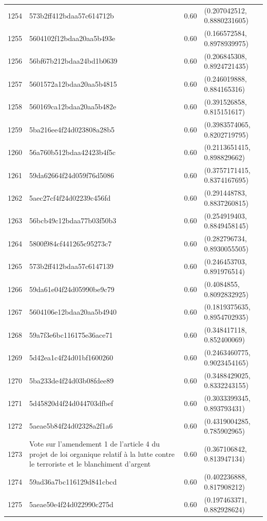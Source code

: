 \begin{table}[ht]
\begin{tabular}{rlrl}
  1254 & 573b2ff412bdaa57c614712b & 0.60 & (0.207042512, 0.8880231605) \\ 
  1255 & 5604102f12bdaa20aa5b493e & 0.60 & (0.166572584, 0.8978939975) \\ 
  1256 & 56bf67b212bdaa24bd1b0639 & 0.60 & (0.206845308, 0.8924721435) \\ 
  1257 & 5601572a12bdaa20aa5b4815 & 0.60 & (0.246019888, 0.884165316) \\ 
  1258 & 560169ca12bdaa20aa5b482e & 0.60 & (0.391526858, 0.815151617) \\ 
  1259 & 5ba216ee4f24d023808a28b5 & 0.60 & (0.3983574065, 0.8202719795) \\ 
  1260 & 56a760b512bdaa42423b4f5c & 0.60 & (0.2113651415, 0.898829662) \\ 
  1261 & 59da62664f24d059f76d5086 & 0.60 & (0.3757171415, 0.8374167695) \\ 
  1262 & 5aec27cf4f24d02239c456fd & 0.60 & (0.291448783, 0.8837260815) \\ 
  1263 & 56bcb49c12bdaa77b03f50b3 & 0.60 & (0.254919403, 0.8849458145) \\ 
  1264 & 5800f984cf441265c95273c7 & 0.60 & (0.282796734, 0.8930055505) \\ 
  1265 & 573b2ff412bdaa57c6147139 & 0.60 & (0.246453703, 0.891976514) \\ 
  1266 & 59da61e04f24d05990be9c79 & 0.60 & (0.4084855, 0.8092832925) \\ 
  1267 & 5604106e12bdaa20aa5b4940 & 0.60 & (0.1819375635, 0.8954702935) \\ 
  1268 & 59a7f3e6bc116175e36ace71 & 0.60 & (0.348417118, 0.852400069) \\ 
  1269 & 5d42ea1c4f24d01bf1600260 & 0.60 & (0.2463460775, 0.9023454165) \\ 
  1270 & 5ba233de4f24d03b08fdee89 & 0.60 & (0.3488429025, 0.8332243155) \\ 
  1271 & 5d45820d4f24d044703dfbef & 0.60 & (0.3033399345, 0.893793431) \\ 
  1272 & 5aeae5b84f24d02328a2f1a6 & 0.60 & (0.4319004285, 0.785902965) \\ 
  1273 & Vote sur l'amendement 1 de l'article 4 du projet de loi organique relatif à la lutte contre le terroriste et le blanchiment d'argent & 0.60 & (0.367106842, 0.813947134) \\ 
  1274 & 59ad36a7bc116129d841cbcd & 0.60 & (0.402236888, 0.817908212) \\ 
  1275 & 5aeae50e4f24d022990c275d & 0.60 & (0.197463371, 0.882928624) \\ 

\end{tabular}
\end{table}
